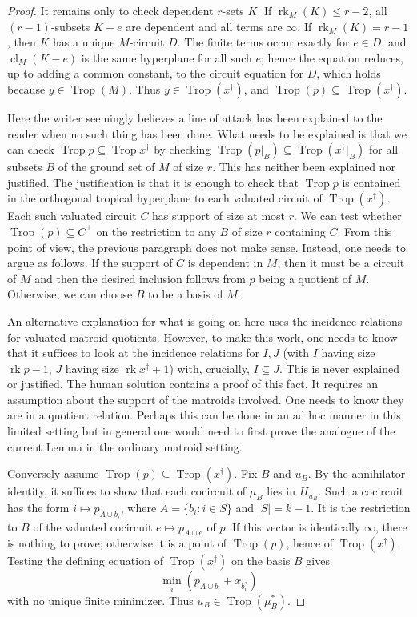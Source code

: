 \documentclass[12pt]{article}
\theoremstyle{definition}
\newcommand{\Trop}{\operatorname{Trop}}
\newcommand{\rk}{\operatorname{rk}}
\newcommand{\cl}{\operatorname{cl}}
\newcommand{\review}[1]{\begin{reviewbox}#1\end{reviewbox}}
\begin{document}
\begin{proof}
It remains only to check dependent \(r\)-sets \(K\).  If \(\rk_M(K)\le r-2\), all \((r-1)\)-subsets \(K-e\) are dependent and all terms are \(\infty\).  If \(\rk_M(K)=r-1\), then \(K\) has a unique \(M\)-circuit \(D\).  The finite terms occur exactly for \(e\in D\), and \(\cl_M(K-e)\) is the same hyperplane for all such \(e\); hence the equation reduces, up to adding a common constant, to the circuit equation for \(D\), which holds because \(y\in\Trop(M)\).  Thus \(y\in\Trop(x^\dagger)\), and \(\Trop(p)\subseteq\Trop(x^\dagger)\).
\review{Here the writer seemingly believes a line of attack has been explained to the reader when no such thing has been done. What needs to be explained is that we can check $\Trop p \subseteq \Trop x^{\dagger}$ by checking $\Trop(p|_B) \subseteq \Trop(x^{\dagger}|_B)$ for all subsets $B$ of the ground set of $M$ of size $r$. This has neither been explained nor justified. The justification is that it is enough to check that $\Trop p$ is contained in the orthogonal tropical hyperplane to each valuated circuit of 
$\Trop(x^{\dagger})$. Each such valuated circuit $C$ has support of size at most $r$. We can test whether $\Trop(p) \subseteq C^{\perp}$ on the restriction to any $B$ of size $r$ containing $C$. From this point of view, the previous paragraph does not make sense. Instead, one needs to argue as follows. If the support of $C$ is dependent in $M$, then it must be a circuit of $M$ and then the desired inclusion follows from $p$ being a quotient of $M$. Otherwise, we can choose $B$ to be a basis of $M$.

An alternative explanation for what is going on here uses the incidence relations for valuated matroid quotients. However, to make this work, one needs to know that it suffices to look at the incidence relations for $I, J$ (with $I$ having size $\rk p - 1$, $J$ having size $\rk x^{\dagger} + 1$) with, crucially, $I \subseteq J$. This is never explained or justified. The human solution contains a proof of this fact. It requires an assumption about the support of the matroids involved. One needs to know they are in a quotient relation. Perhaps this can be done in an ad hoc manner in this limited setting but in general one would need to first prove the analogue of the current Lemma in the ordinary matroid setting.
}

Conversely assume \(\Trop(p)\subseteq\Trop(x^\dagger)\).  Fix \(B\) and \(u_B\).  By the annihilator identity, it suffices to show that each cocircuit of \(\mu_B\) lies in \(H_{u_B}\).  Such a cocircuit has the form \(i\mapsto p_{A\cup b_i}\), where \(A=\{b_i:i\in S\}\) and \(|S|=k-1\).  It is the restriction to \(B\) of the valuated cocircuit \(e\mapsto p_{A\cup e}\) of \(p\).  If this vector is identically \(\infty\), there is nothing to prove; otherwise it is a point of \(\Trop(p)\), hence of \(\Trop(x^\dagger)\).  Testing the defining equation of \(\Trop(x^\dagger)\) on the basis \(B\) gives
\[
\min_i(p_{A\cup b_i}+x_{b_i^*})
\]
with no unique finite minimizer.  Thus \(u_B\in\Trop(\mu_B^*)\).


\end{proof}
\end{document}
